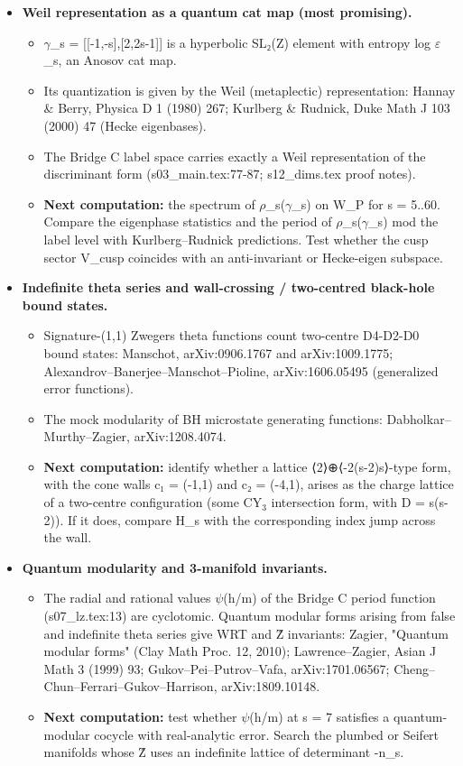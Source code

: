\documentclass[10pt]{article}\usepackage[margin=0.8in]{geometry}\usepackage{amssymb,longtable,array,url,hyperref}\usepackage[T1]{fontenc}\usepackage{lmodern}\sloppy\usepackage{newunicodechar}\newunicodechar{η}{\ensuremath{\eta}}\newunicodechar{ω}{\ensuremath{\omega}}\newunicodechar{⁺}{\ensuremath{^{+}}}\newunicodechar{⁻}{\ensuremath{^{-}}}\newunicodechar{∏}{\ensuremath{\prod}}\newunicodechar{⁸}{\ensuremath{^{8}}}\newunicodechar{⁴}{\ensuremath{^{4}}}\newunicodechar{⁶}{\ensuremath{^{6}}}\newunicodechar{θ}{\ensuremath{\theta}}\newunicodechar{₇}{\ensuremath{_{7}}}\newunicodechar{₂}{\ensuremath{_{2}}}\newunicodechar{₁}{\ensuremath{_{1}}}\newunicodechar{⊕}{\ensuremath{\oplus}}
\begin{document}
\begin{itemize}
\item  \textbf{Weil representation as a quantum cat map (most promising).}
\begin{itemize}
\item  $\gamma$\_s = [[-1,-s],[2,2s-1]] is a hyperbolic SL₂(Z) element with entropy log $\varepsilon$\_s, an Anosov cat map.
\item  Its quantization is given by the Weil (metaplectic) representation: Hannay \& Berry, Physica D 1 (1980) 267; Kurlberg \& Rudnick, Duke Math J 103 (2000) 47 (Hecke eigenbases).
\item  The Bridge C label space carries exactly a Weil representation of the discriminant form (s03\_main.tex:77-87; s12\_dims.tex proof notes).
\item  \textbf{Next computation:} the spectrum of $\rho$\_s($\gamma$\_s) on W\_P for s = 5..60. Compare the eigenphase statistics and the period of $\rho$\_s($\gamma$\_s) mod the label level with Kurlberg--Rudnick predictions. Test whether the cusp sector V\_cusp coincides with an anti-invariant or Hecke-eigen subspace.
\end{itemize}
\item  \textbf{Indefinite theta series and wall-crossing / two-centred black-hole bound states.}
\begin{itemize}
\item  Signature-(1,1) Zwegers theta functions count two-centre D4-D2-D0 bound states: Manschot, arXiv:0906.1767 and arXiv:1009.1775; Alexandrov--Banerjee--Manschot--Pioline, arXiv:1606.05495 (generalized error functions).
\item  The mock modularity of BH microstate generating functions: Dabholkar--Murthy--Zagier, arXiv:1208.4074.
\item  \textbf{Next computation:} identify whether a lattice ⟨2⟩⊕⟨-2(s-2)s⟩-type form, with the cone walls c₁ = (-1,1) and c₂ = (-4,1), arises as the charge lattice of a two-centre configuration (some CY$_3$ intersection form, with D = s(s-2)). If it does, compare H\_s with the corresponding index jump across the wall.
\end{itemize}
\item  \textbf{Quantum modularity and 3-manifold invariants.}
\begin{itemize}
\item  The radial and rational values $\psi$(h/m) of the Bridge C period function (s07\_lz.tex:13) are cyclotomic. Quantum modular forms arising from false and indefinite theta series give WRT and Ẑ invariants: Zagier, "Quantum modular forms" (Clay Math Proc. 12, 2010); Lawrence--Zagier, Asian J Math 3 (1999) 93; Gukov--Pei--Putrov--Vafa, arXiv:1701.06567; Cheng--Chun--Ferrari--Gukov--Harrison, arXiv:1809.10148.
\item  \textbf{Next computation:} test whether $\psi$(h/m) at s = 7 satisfies a quantum-modular cocycle with real-analytic error. Search the plumbed or Seifert manifolds whose Ẑ uses an indefinite lattice of determinant -n\_s.
\end{itemize}
\end{itemize}
\end{document}
